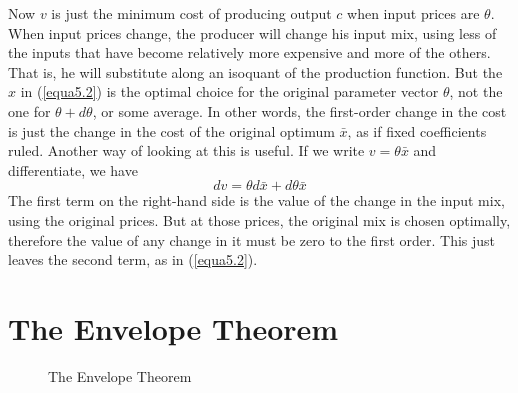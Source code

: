 Now $v$ is just the minimum cost of producing output $c$ when input prices are $\theta$. When input prices change, the producer will change his input mix, using less of the inputs that have become relatively more expensive and more of the others. That is, he will substitute along an isoquant of the production function. But the $x$ in (\ref{equa5.2}) is the optimal choice for the original parameter vector $\theta$, not the one for $\theta +d\theta$, or some average. In other words, the first-order change in the cost is just the change in the cost of the original optimum $\bar{x}$, as if fixed coefficients ruled. Another way of looking at this is useful. If we write $v=\theta \bar{x}$ and differentiate, we have
\begin{equation*} 
dv = \theta d\bar{x} + d\theta \bar{x}
\end{equation*}
The first term on the right-hand side is the value of the change in the input mix, using the original prices. But at those prices, the original mix is chosen optimally, therefore the value of any change in it must be zero to the first order. This just leaves the second term, as in (\ref{equa5.2}).

\section*{The Envelope Theorem}

\begin{figure}[!htb] %
\centering %
\caption{The Envelope Theorem} %
\label{Fig5.1} %
\end{figure}

